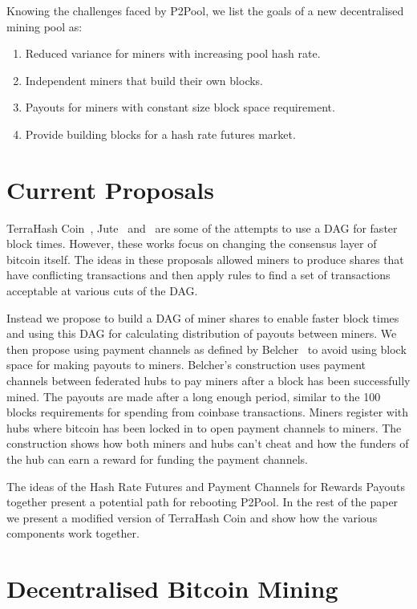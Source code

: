 \documentclass{article}
\begin{document}
Knowing the challenges faced by P2Pool, we list the goals of a new
decentralised mining pool as:

\begin{enumerate}
\item Reduced variance for miners with increasing pool hash rate.
\item Independent miners that build their own blocks.
\item Payouts for miners with constant size block space requirement.
\item Provide building blocks for a hash rate futures market.
\end{enumerate}

\section{Current Proposals}

TerraHash Coin~\cite{mcelrath:variance}, Jute~\cite{jute}
and~\cite{spectre} are some of the attempts to use a DAG for faster
block times. However, these works focus on changing the consensus
layer of bitcoin itself. The ideas in these proposals allowed miners
to produce shares that have conflicting transactions and then apply
rules to find a set of transactions acceptable at various cuts of the
DAG.\@

Instead we propose to build a DAG of miner shares to enable faster
block times and using this DAG for calculating distribution of payouts
between miners. We then propose using payment channels as defined by
Belcher~\cite{channels-for-rewards} to avoid using block space for
making payouts to miners. Belcher's construction uses payment channels
between federated hubs to pay miners after a block has been
successfully mined. The payouts are made after a long enough period,
similar to the 100 blocks requirements for spending from coinbase
transactions. Miners register with hubs where bitcoin has been locked
in to open payment channels to miners. The construction shows how both
miners and hubs can't cheat and how the funders of the hub can earn a
reward for funding the payment channels.

The ideas of the Hash Rate Futures and Payment Channels for Rewards
Payouts together present a potential path for rebooting P2Pool. In the
rest of the paper we present a modified version of TerraHash Coin and
show how the various components work together.

\section{Decentralised Bitcoin Mining}
\end{document}
